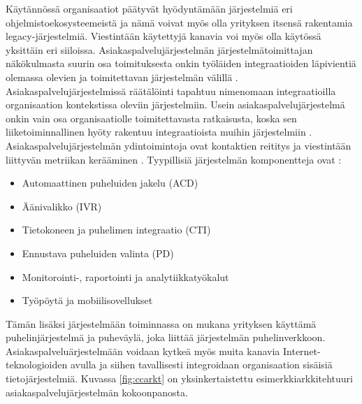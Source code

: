 \documentclass[finnish,12pt,a4paper,pdftex]{article}
\begin{document}
\noindent Käytännössä organisaatiot päätyvät hyödyntämään järjestelmiä eri ohjelmistoekosysteemeistä ja nämä voivat myös olla yrityksen itsensä rakentamia legacy-järjestelmiä. Viestintään käytettyjä kanavia voi myös olla käytössä yksittäin eri siiloissa. Asiakaspalvelujärjestelmän järjestelmätoimittajan näkökulmasta suurin osa toimituksesta onkin työläiden integraatioiden läpivientiä olemassa olevien ja toimitettavan järjestelmän välillä \citep{vcc, ccinfo}. Asiakaspalvelujärjestelmissä räätälöinti tapahtuu nimenomaan integraatioilla organisaation kontekstissa oleviin järjestelmiin. Usein asiakaspalvelujärjestelmä onkin vain osa organisaatiolle toimitettavasta ratkaisusta, koska sen liiketoiminnallinen hyöty rakentuu integraatioista muihin järjestelmiin \citep{bernier}.\\

Asiakaspalvelujärjestelmän ydintoimintoja ovat kontaktien reititys ja viestintään liittyvän metriikan kerääminen \citep{vcc}. Tyypillisiä järjestelmän komponentteja ovat \citep{bernier}:

\begin{itemize}
\setlength{\itemsep}{0pt}
    \item Automaattinen puheluiden jakelu (ACD)
    \item Äänivalikko (IVR)
    \item Tietokoneen ja puhelimen integraatio (CTI)
    \item Ennustava puheluiden valinta (PD)
    \item Monitorointi-, raportointi ja analytiikkatyökalut
    \item Työpöytä ja mobiilisovellukset
\end{itemize}

\noindent Tämän lisäksi järjestelmään toiminnassa on mukana yrityksen käyttämä puhelinjärjestelmä ja puheväylä, joka liittää järjestelmän puhelinverkkoon. Asiakaspalveluärjestelmään voidaan kytkeä myös muita kanavia Internet-teknologioiden avulla ja siihen tavallisesti integroidaan organisaation sisäisiä tietojärjestelmiä. Kuvassa \ref{fig:ccarkt} on yksinkertaistettu esimerkkiarkkitehtuuri asiakaspalvelujärjestelmän kokoonpanosta. 
\end{document}
